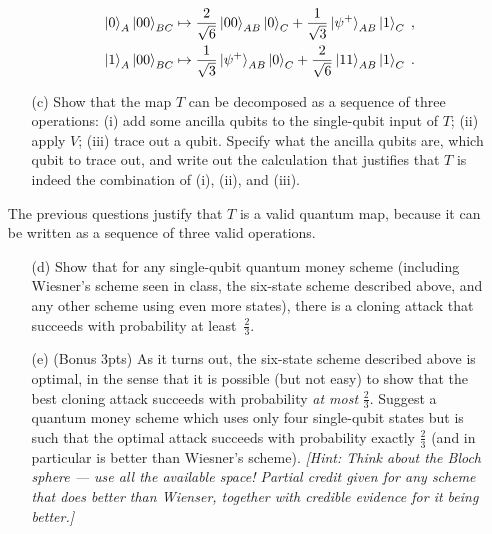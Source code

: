 \documentclass[12pt]{article}
\begin{document}
\begin{enumerate}
\begin{enumerate}
\begin{align*}
\ket{0}_A \ket{00}_{BC} \mapsto \frac{2}{\sqrt{6}}\ket{00}_{AB}\ket{0}_C + \frac{1}{\sqrt{3}} \ket{\psi^+}_{AB} \ket{1}_C \;,\\
\ket{1}_A \ket{00}_{BC} \mapsto  \frac{1}{\sqrt{3}} \ket{\psi^+}_{AB}\ket{0}_C + \frac{2}{\sqrt{6}}\ket{11}_{AB}\ket{1}_C \;.
\end{align*}
\item[(c)] Show that the map $T$ can be decomposed as a sequence of three operations: (i) add some ancilla qubits to the single-qubit input of $T$; (ii) apply $V$; (iii) trace out a qubit. Specify what the ancilla qubits are, which qubit to trace out, and write out the calculation that justifies that $T$ is indeed the combination of (i), (ii), and (iii). 
\end{enumerate}
The previous questions justify that $T$ is a valid quantum map, because it can be written as a sequence of three valid operations.
\begin{enumerate}
\item[(d)] Show that for any single-qubit quantum money scheme (including Wiesner's scheme seen in class, the six-state scheme described above, and any other scheme using even more states), there is a cloning attack that succeeds with probability at least~$\frac{2}{3}$. 
\item[(e)] (Bonus 3pts) As it turns out, the six-state scheme described above is optimal, in the sense that it is possible (but not easy) to show that the best cloning attack succeeds with probability \emph{at most} $\frac{2}{3}$. Suggest a quantum money scheme which uses only four single-qubit states but is such that the optimal attack succeeds with probability exactly $\frac{2}{3}$ (and in particular is better than Wiesner's scheme). {\em [Hint: Think about the Bloch sphere --- use all the available space! Partial credit given for any scheme that does better than Wienser, together with credible evidence for it being better.]} 
\end{enumerate}


\end{enumerate}
\end{document}
